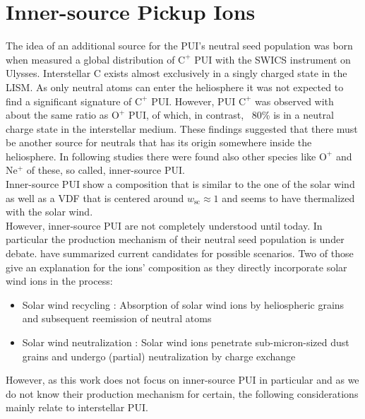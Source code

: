 \section{Inner-source Pickup Ions}
The idea of an additional source for the PUI's neutral seed population was born when \citet{geiss_1995a} measured a global distribution of $\mathrm{C^{+}}$ PUI with the SWICS instrument on Ulysses.  Interstellar $\mathrm{C}$ exists almost exclusively in a singly charged state \citep{Frisch} in the LISM. As only neutral atoms can enter the heliosphere it was not expected to find a significant signature of $\mathrm{C^{+}}$ PUI. However, PUI $\mathrm{C^{+}}$ was observed with about the same ratio as $\mathrm{O^{+}}$ PUI, of which, in contrast, ~80\% is in a neutral charge state in the interstellar medium. These findings suggested that there must be another source for neutrals that has its origin somewhere inside the heliosphere. In following studies \citep[e.g.][]{geiss_1995b} there were found also other species like $\mathrm{O^{+}}$ and $\mathrm{Ne^{+}}$ of these, so called, inner-source PUI.\\
Inner-source PUI show a composition that is similar to the one of the solar wind \citep{gloeckler2000_innersource, allegrini_2005} as well as a VDF that is centered around $w_{\mathrm{sc}} \approx 1$ \citep{schwadron_2000} and seems to have thermalized with the solar wind.
\\
However, inner-source PUI are not completely understood until today. In particular the production mechanism of their neutral seed population is under debate. \citet{allegrini_2005} have summarized current candidates for possible scenarios. Two of those give an explanation for the ions' composition as they directly incorporate solar wind ions in the process:
\begin{itemize}
	\item Solar wind recycling \citep{gloeckler2000_innersource, schwadron_2000}: Absorption of solar wind ions by heliospheric grains and subsequent reemission of neutral atoms
	\item Solar wind neutralization \citep{wimmer_2002}: Solar wind ions penetrate sub-micron-sized dust grains and undergo (partial) neutralization by charge exchange
\end{itemize}
However, as this work does not focus on inner-source PUI in particular and as we do not know their production mechanism for certain, the following considerations mainly relate to interstellar PUI.
%
%
%
